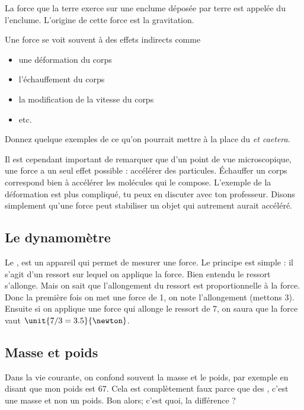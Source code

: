 \begin{exemple}
La force que la terre exerce sur une enclume déposée par terre est appelée  du l'enclume. L'origine de cette force est la gravitation.
\end{exemple}

Une force se voit souvent à des effets indirects comme 
\begin{itemize}
\item une déformation du corps
\item l'échauffement du corps
\item la modification de la vitesse du corps
\item etc.
\end{itemize}
\begin{exercice}
Donnez quelque exemples de ce qu'on pourrait mettre à la place du \emph{et caetera}.
\end{exercice}
Il est cependant important de remarquer que d'un point de vue microscopique, une force a un seul effet possible : accélérer des particules. Échauffer un corps correspond bien à accélérer les molécules qui le compose. L'exemple de la déformation est plus compliqué, tu peux en discuter avec ton professeur. Disons simplement qu'une force peut stabiliser un objet qui autrement aurait accéléré.

\subsection{Le dynamomètre}

Le , est un appareil qui permet de mesurer une force. Le principe est simple : il s'agit d'un ressort sur lequel on applique la force. Bien entendu le ressort s'allonge. Mais on sait que l'allongement du ressort est proportionnelle à la force. Donc la première fois on met une force de \unit{1}{\newton}, on note l'allongement (mettons \unit{3}{\centi\meter}). Ensuite si on applique une force qui allonge le ressort de \unit{7}{\centi\meter}, on saura que la force vaut $\unit{7/3=3.5}{\newton}$.

\subsection{Masse et poids}

Dans la vie courante, on confond souvent la masse et le poids, par exemple en disant que \og mon poids est \unit{67}{\kilo\gram}\fg. Cela est complètement faux parce que des \kilo\gram, c'est une masse et non un poids. Bon alors; c'est quoi, la différence ?

